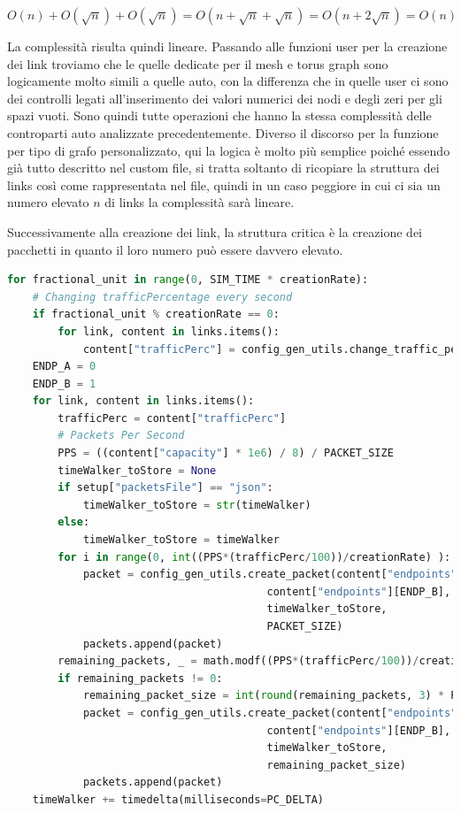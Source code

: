 \documentclass[binding=0.6cm]{sapthesis}
\begin{document}
\[
    O(n) + O(\sqrt{n}) + O(\sqrt{n}) = O(n + \sqrt{n} + \sqrt{n}) = O(n + 2\sqrt{n}) = O(n)
\]

La complessità risulta quindi lineare.
Passando alle funzioni user per la creazione dei link troviamo che le quelle dedicate per il mesh e torus graph sono logicamente molto simili a quelle auto, con
la differenza che in quelle user ci sono dei controlli legati all'inserimento dei valori numerici dei nodi e degli zeri per gli spazi vuoti. Sono quindi tutte operazioni che hanno la stessa complessità delle controparti auto analizzate precedentemente.
Diverso il discorso per la funzione per tipo di grafo personalizzato, qui la logica è molto più semplice
poiché essendo già tutto descritto nel custom file, si tratta soltanto di ricopiare la struttura dei links così come rappresentata nel file,
quindi in un caso peggiore in cui ci sia un numero elevato \(n\) di links la complessità sarà lineare.

Successivamente alla creazione dei link, la struttura critica è la creazione dei pacchetti in quanto il loro numero può essere davvero elevato.

{\scriptsize
\begin{lstlisting}[language=Python, basicstyle=\ttfamily, caption={Logica creazione pacchetti}, label={codice:create_packets}, breaklines=true]
for fractional_unit in range(0, SIM_TIME * creationRate):
    # Changing trafficPercentage every second
    if fractional_unit % creationRate == 0:
        for link, content in links.items():
            content["trafficPerc"] = config_gen_utils.change_traffic_perc(content["trafficPerc"], setup["trafficVariation"])
    ENDP_A = 0
    ENDP_B = 1
    for link, content in links.items():
        trafficPerc = content["trafficPerc"]
        # Packets Per Second
        PPS = ((content["capacity"] * 1e6) / 8) / PACKET_SIZE
        timeWalker_toStore = None
        if setup["packetsFile"] == "json":
            timeWalker_toStore = str(timeWalker)
        else:
            timeWalker_toStore = timeWalker
        for i in range(0, int((PPS*(trafficPerc/100))/creationRate) ):
            packet = config_gen_utils.create_packet(content["endpoints"][ENDP_A],
                                         content["endpoints"][ENDP_B],
                                         timeWalker_toStore,
                                         PACKET_SIZE)
            packets.append(packet)
        remaining_packets, _ = math.modf((PPS*(trafficPerc/100))/creationRate)
        if remaining_packets != 0:
            remaining_packet_size = int(round(remaining_packets, 3) * PACKET_SIZE)
            packet = config_gen_utils.create_packet(content["endpoints"][ENDP_A],
                                         content["endpoints"][ENDP_B],
                                         timeWalker_toStore,
                                         remaining_packet_size)
            packets.append(packet)
    timeWalker += timedelta(milliseconds=PC_DELTA)
\end{lstlisting}
}
\end{document}
